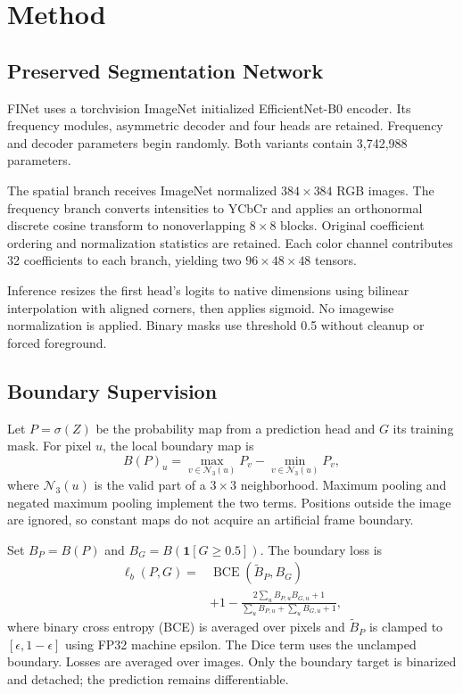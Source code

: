 \documentclass[conference,letterpaper]{IEEEtran}
\begin{document}
\section{Method}
\subsection{Preserved Segmentation Network}
FINet uses a torchvision ImageNet initialized EfficientNet-B0 encoder. Its frequency modules, asymmetric decoder and four heads are retained. Frequency and decoder parameters begin randomly. Both variants contain 3,742,988 parameters.

The spatial branch receives ImageNet normalized $384\times384$ RGB images. The frequency branch converts intensities to YCbCr and applies an orthonormal discrete cosine transform to nonoverlapping $8\times8$ blocks. Original coefficient ordering and normalization statistics are retained. Each color channel contributes 32 coefficients to each branch, yielding two $96\times48\times48$ tensors.

Inference resizes the first head's logits to native dimensions using bilinear interpolation with aligned corners, then applies sigmoid. No imagewise normalization is applied. Binary masks use threshold 0.5 without cleanup or forced foreground.

\subsection{Boundary Supervision}
Let $P=\sigma(Z)$ be the probability map from a prediction head and $G$ its training mask. For pixel $u$, the local boundary map is
\begin{equation}
 B(P)_u=\max_{v\in\mathcal{N}_3(u)}P_v-
             \min_{v\in\mathcal{N}_3(u)}P_v,
 \label{eq:boundary}
\end{equation}
where $\mathcal{N}_3(u)$ is the valid part of a $3\times3$ neighborhood. Maximum pooling and negated maximum pooling implement the two terms. Positions outside the image are ignored, so constant maps do not acquire an artificial frame boundary.

Set $B_P=B(P)$ and $B_G=B(\mathbf{1}[G\geq0.5])$. The boundary loss is
\begin{equation}
\begin{aligned}
 \ell_b(P,G)={}&\operatorname{BCE}(\widetilde{B}_P,B_G)\\
 &+1-\frac{2\sum_u B_{P,u}B_{G,u}+1}
 {\sum_u B_{P,u}+\sum_u B_{G,u}+1},
\end{aligned}
\label{eq:boundaryloss}
\end{equation}
where binary cross entropy (BCE) is averaged over pixels and $\widetilde{B}_P$ is clamped to $[\epsilon,1-\epsilon]$ using FP32 machine epsilon. The Dice term uses the unclamped boundary. Losses are averaged over images. Only the boundary target is binarized and detached; the prediction remains differentiable.
\end{document}
